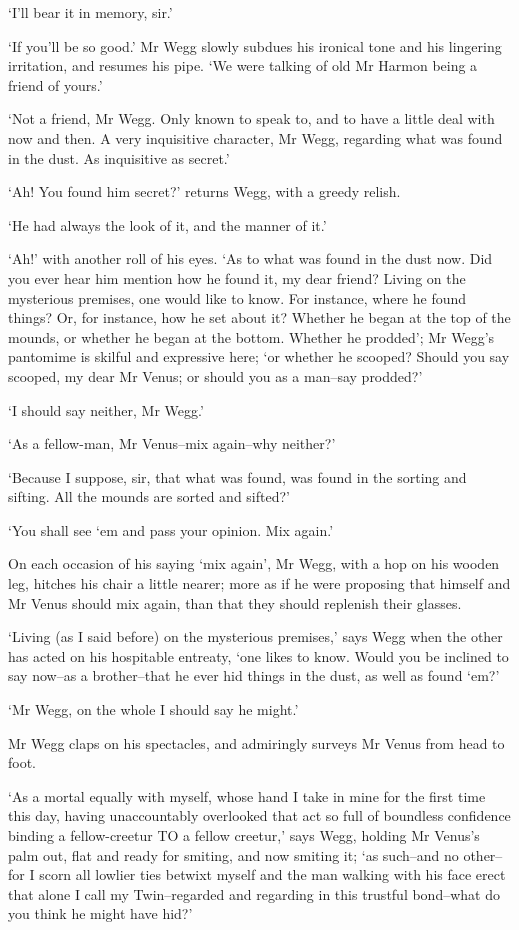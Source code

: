 ‘I’ll bear it in memory, sir.’

‘If you’ll be so good.’ Mr Wegg slowly subdues his ironical tone and his
lingering irritation, and resumes his pipe. ‘We were talking of old Mr
Harmon being a friend of yours.’

‘Not a friend, Mr Wegg. Only known to speak to, and to have a little
deal with now and then. A very inquisitive character, Mr Wegg, regarding
what was found in the dust. As inquisitive as secret.’

‘Ah! You found him secret?’ returns Wegg, with a greedy relish.

‘He had always the look of it, and the manner of it.’

‘Ah!’ with another roll of his eyes. ‘As to what was found in the dust
now. Did you ever hear him mention how he found it, my dear friend?
Living on the mysterious premises, one would like to know. For instance,
where he found things? Or, for instance, how he set about it? Whether
he began at the top of the mounds, or whether he began at the bottom.
Whether he prodded’; Mr Wegg’s pantomime is skilful and expressive here;
‘or whether he scooped? Should you say scooped, my dear Mr Venus; or
should you as a man--say prodded?’

‘I should say neither, Mr Wegg.’

‘As a fellow-man, Mr Venus--mix again--why neither?’

‘Because I suppose, sir, that what was found, was found in the sorting
and sifting. All the mounds are sorted and sifted?’

‘You shall see ‘em and pass your opinion. Mix again.’

On each occasion of his saying ‘mix again’, Mr Wegg, with a hop on
his wooden leg, hitches his chair a little nearer; more as if he were
proposing that himself and Mr Venus should mix again, than that they
should replenish their glasses.

‘Living (as I said before) on the mysterious premises,’ says Wegg when
the other has acted on his hospitable entreaty, ‘one likes to know.
Would you be inclined to say now--as a brother--that he ever hid things
in the dust, as well as found ‘em?’

‘Mr Wegg, on the whole I should say he might.’

Mr Wegg claps on his spectacles, and admiringly surveys Mr Venus from
head to foot.

‘As a mortal equally with myself, whose hand I take in mine for the
first time this day, having unaccountably overlooked that act so full of
boundless confidence binding a fellow-creetur TO a fellow creetur,’ says
Wegg, holding Mr Venus’s palm out, flat and ready for smiting, and now
smiting it; ‘as such--and no other--for I scorn all lowlier ties betwixt
myself and the man walking with his face erect that alone I call my
Twin--regarded and regarding in this trustful bond--what do you think he
might have hid?’

